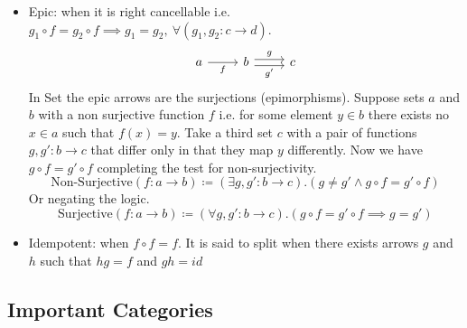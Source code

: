 \begin{itemize}
  \item Epic: when it is right cancellable i.e.
    $g_1 \circ f = g_2 \circ f \implies g_1 = g_2,\ \forall (g_1, g_2: c\to d)$.
    \[\begin{tikzcd}
      a & b & c
      \arrow["{g'}"', shift right=1, from=1-2, to=1-3]
      \arrow["f"', from=1-1, to=1-2]
      \arrow["g", shift left=1, from=1-2, to=1-3]
    \end{tikzcd}\]
    In Set the epic arrows are the surjections (epimorphisms).
    Suppose sets $a$ and $b$ with a non surjective function $f$ i.e. for some
    element $y\in b$ there exists no $x\in a$ such that $f(x) = y$. Take a third
    set $c$ with a pair of functions $g, g':b\to c$ that differ only in that
    they map $y$ differently. Now we have $g\circ f = g'\circ f$ completing the
    test for non-surjectivity.
    \[\text{Non-Surjective}(f:a\to b)
      \coloneq(\exists g, g':b\to c).(g \neq g' \land g\circ f = g'\circ f)\]
    Or negating the logic.
    \[\text{Surjective}(f:a\to b)
      \coloneq(\forall g, g':b\to c).(g\circ f = g'\circ f \implies g=g')\]

  \item Idempotent: when $f\circ f = f$. It is said to split when there exists
    arrows $g$ and $h$ such that $hg = f$ and $gh = id$
\end{itemize}

\subsection{Important Categories}

